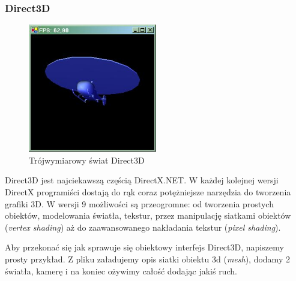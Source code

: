 \subsubsection{Direct3D}

\begin{figure}
\begin{center}
\includegraphics[width=0.50\textwidth]{./pic/dx1}
\caption{Trójwymiarowy świat Direct3D}
\end{center}
\end{figure}

Direct3D jest najciekawszą częścią DirectX.NET. W każdej kolejnej wersji DirectX programiści 
dostają do rąk coraz potężniejsze narzędzia do tworzenia grafiki 3D. W wersji 9 możliwości są 
przeogromne: od tworzenia prostych obiektów, modelowania światła, tekstur, przez manipulację 
siatkami obiektów ({\em vertex shading}) aż do zaawansowanego nakładania tekstur ({\em pixel shading}).  

Aby przekonać się jak sprawuje się obiektowy interfejs Direct3D, napiszemy prosty przykład. 
Z pliku załadujemy opis siatki obiektu 3d ({\em mesh}), dodamy 2 światła, kamerę i na koniec ożywimy 
całość dodając jakiś ruch.

